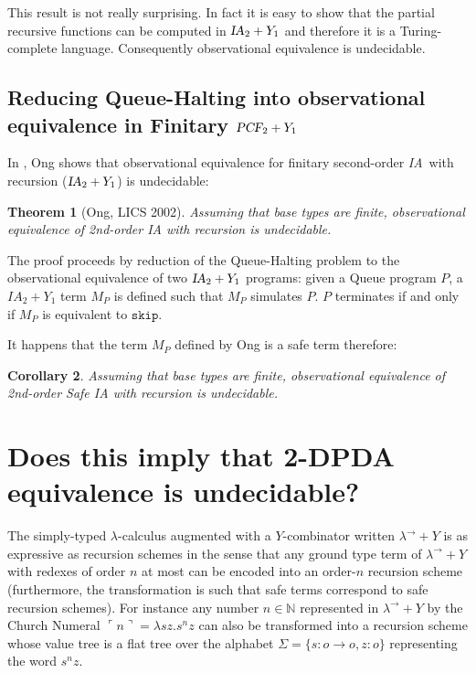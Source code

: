 \documentclass{article}
\newtheorem{theorem}{Theorem}[section]
\newtheorem{corollary}[theorem]{Corollary}
\newcommand{\encode}[1]{\ulcorner #1 \urcorner}
\newcommand{\nat}{\mathbb{N}}
\newcommand\ialgol{{\textsl{IA}}}
\newcommand\pcf{\textsl{PCF}}
\newcommand\iaskip{\texttt{skip}}
\begin{document}
This result is not really surprising. In fact it is easy to show that the partial recursive functions can be computed in $\ialgol_2 + Y_1$ and therefore it is a Turing-complete language. Consequently observational equivalence is undecidable.


\subsection{Reducing Queue-Halting into observational equivalence in Finitary $\pcf_2 + Y_1$}

In \cite{Ong02}, Ong shows that observational equivalence for finitary second-order \ialgol\ with recursion ($\ialgol_2 + Y_1$) is undecidable:
\begin{theorem}[Ong, LICS 2002]
Assuming that base types are finite, observational equivalence of 2nd-order IA with recursion is undecidable.
\end{theorem}

The proof proceeds by reduction of the Queue-Halting problem to the observational equivalence of two $\ialgol_2 + Y_1$ programs:
given a Queue program $P$, a $IA_2 + Y_1$ term $M_P$ is defined such that $M_P$ simulates $P$. $P$ terminates if and only if $M_P$ is equivalent to $\iaskip$.

It happens that the term $M_P$ defined by Ong is a safe term therefore:
\begin{corollary}
Assuming that base types are finite, observational equivalence of 2nd-order Safe IA with recursion is undecidable.
\end{corollary}

\section{Does this imply that 2-DPDA equivalence is undecidable?}

The simply-typed $\lambda$-calculus augmented with a $Y$-combinator written $\lambda^\rightarrow + Y$ is as expressive as recursion schemes in the sense that any ground type term of $\lambda^\rightarrow + Y$ with redexes of order $n$ at most can be encoded into an order-$n$ recursion scheme (furthermore, the transformation is such that safe terms correspond to safe recursion schemes).
For instance any number $n \in \nat$ represented in $\lambda^\rightarrow + Y$ by the Church Numeral $\encode{n} = \lambda s z. s^n z$ can also be transformed into a recursion scheme whose value tree is a flat tree over the alphabet $\Sigma = \{s:o\rightarrow o, z:o\}$ representing the word $s^n z$. 
\end{document}
